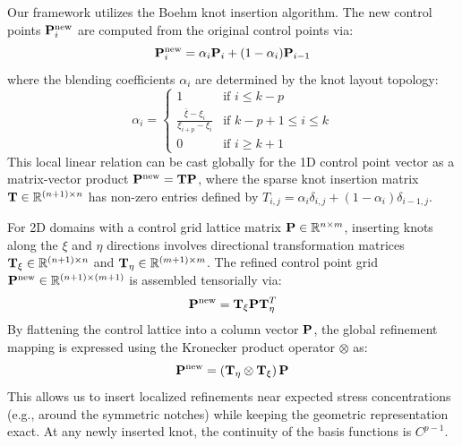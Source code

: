 Our framework utilizes the Boehm knot insertion algorithm. The new control points $\mathbf{P}_i^{\text{new}}$ are computed from the original control points via:
\begin{equation}
    \mathbf{P}_i^{\text{new}} = \alpha_i \mathbf{P}_i + (1 - \alpha_i) \mathbf{P}_{i-1}
\end{equation}
where the blending coefficients $\alpha_i$ are determined by the knot layout topology:
\begin{equation}
    \alpha_i = \begin{cases}
        1                                           & \text{if } i \le k - p           \\
        \frac{\bar{\xi} - \xi_i}{\xi_{i+p} - \xi_i} & \text{if } k - p + 1 \le i \le k \\
        0                                           & \text{if } i \ge k + 1
    \end{cases}
\end{equation}
This local linear relation can be cast globally for the 1D control point vector as a matrix-vector product $\mathbf{P}^{\text{new}} = \mathbf{T} \mathbf{P}$, where the sparse knot insertion matrix $\mathbf{T} \in \mathbb{R}^{(n+1) \times n}$ has non-zero entries defined by $T_{i, j} = \alpha_i \delta_{i, j} + (1 - \alpha_i) \delta_{i-1, j}$.

For 2D domains with a control grid lattice matrix $\mathbf{P} \in \mathbb{R}^{n \times m}$, inserting knots along the $\xi$ and $\eta$ directions involves directional transformation matrices $\mathbf{T}_{\xi} \in \mathbb{R}^{(n+1) \times n}$ and $\mathbf{T}_{\eta} \in \mathbb{R}^{(m+1) \times m}$. The refined control point grid $\mathbf{P}^{\text{new}} \in \mathbb{R}^{(n+1) \times (m+1)}$ is assembled tensorially via:
\begin{equation}
    \mathbf{P}^{\text{new}} = \mathbf{T}_{\xi} \mathbf{P} \mathbf{T}_{\eta}^T
\end{equation}
By flattening the control lattice into a column vector $\mathbf{P}$, the global refinement mapping is expressed using the Kronecker product operator $\otimes$ as:
\begin{equation}
    \mathbf{P}^{\text{new}} = \left( \mathbf{T}_{\eta} \otimes \mathbf{T}_{\xi} \right) \mathbf{P}
\end{equation}
This allows us to insert localized refinements near expected stress concentrations (e.g., around the symmetric notches) while keeping the geometric representation exact. At any newly inserted knot, the continuity of the basis functions is $C^{p-1}$.

